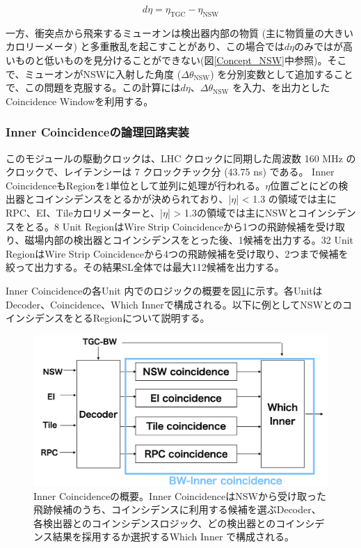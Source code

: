 \begin{equation}
    d\eta = \eta_{\mathrm{TGC}} - \eta_{\mathrm{NSW}}
    \label{eq:deta}
\end{equation}

一方、衝突点から飛来するミューオンは検出器内部の物質 (主に物質量の大きいカロリーメータ) と多重散乱を起こすことがあり、この場合では$d\eta$のみでは\pt が高いものと低いものを見分けることができない(図\ref{Concept_NSW}中参照)。そこで、ミューオンがNSWに入射した角度 ($\Delta\theta_{\mathrm{NSW}}$) を分別変数として追加することで、この問題を克服する。この計算には$d\eta$、$\Delta\theta_{\mathrm{NSW}}$ を入力、\pt を出力としたCoincidence Windowを利用する。

\subsubsection*{Inner Coincidenceの論理回路実装}
このモジュールの駆動クロックは、LHC クロックに同期した周波数 160 MHz のクロックで、レイテンシーは 7 クロックチック分 (43.75 ns) である。
Inner CoincidenceもRegionを1単位として並列に処理が行われる。$\eta$位置ごとにどの検出器とコインシデンスをとるかが決められており、|$\eta$| < 1.3 の領域では主にRPC、EI、Tileカロリメーターと、|$\eta$| > 1.3の領域では主にNSWとコインシデンスをとる。8 Unit RegionはWire Strip Coincidenceから1つの飛跡候補を受け取り、磁場内部の検出器とコインシデンスをとった後、1候補を出力する。32 Unit RegionはWire Strip Coincidenceから4つの飛跡候補を受け取り、2つまで候補を絞って出力する。その結果SL全体では最大112候補を出力する。

Inner Coincidenceの各Unit 内でのロジックの概要を図\ref{Inner_logic}に示す。各UnitはDecoder、Coincidence、Which Innerで構成される。以下に例としてNSWとのコインシデンスをとるRegionについて説明する。

\begin{figure} 
\centering
\includegraphics[width=16cm]{fig/SL/Inner_integrate.png}
\caption[Inner Coincidenceの概要]{Inner Coincidenceの概要\cite{mt_kobayashi}。Inner CoincidenceはNSWから受け取った飛跡候補のうち、コインシデンスに利用する候補を選ぶDecoder、各検出器とのコインシデンスロジック、どの検出器とのコインシデンス結果を採用するか選択するWhich Inner で構成される。}
\label{Inner_logic}
\end{figure}

